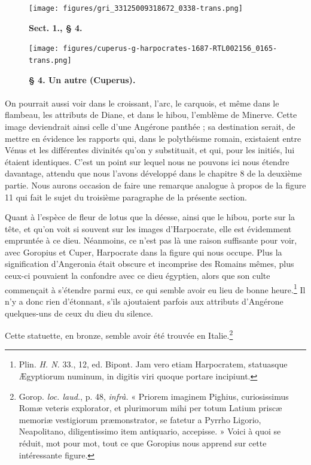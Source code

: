 \documentclass[a4paper, 11pt, oneside, polutonikogreek, french]{article}
\begin{document}
\clearpage
\vspace*{\fill}
\begin{figure}[H]
\centering
\texttt{[image: figures/gri\_33125009318672\_0338-trans.png]}
\caption{\bfseries Sect. 1., § 4.}
\end{figure}
\vspace*{\fill}
\clearpage
\vspace*{\fill}
\begin{figure}[H]
\centering
\texttt{[image: figures/cuperus-g-harpocrates-1687-RTL002156\_0165-trans.png]}
\caption{\bfseries § 4. Un autre (Cuperus).}
\end{figure}
\vspace*{\fill}
\clearpage
\paragraph{}
On pourrait aussi voir dans le croissant, l'arc, le carquois, et même dans le flambeau, les attributs de Diane, et dans le hibou, l'emblème de Minerve. Cette image deviendrait ainsi celle d'une Angérone panthée ; sa destination serait, de mettre en évidence les rapports qui, dans le polythéisme romain, existaient entre Vénus et les différentes divinités qu'on y substituait, et qui, pour les initiés, lui étaient identiques. C'est un point sur lequel nous ne pouvons ici nous étendre davantage, attendu que nous l'avons développé dans le chapitre 8 de la deuxième partie. Nous aurons occasion de faire une remarque analogue à propos de la figure 11 qui fait le sujet du troisième paragraphe de la présente section.

Quant à l'espèce de fleur de lotus que la déesse, ainsi que le hibou, porte sur la tête, et qu'on voit si souvent sur les images d'Harpocrate, elle est évidemment empruntée à ce dieu. Néanmoins, ce n'est pas là une raison suffisante pour voir, avec Goropius et Cuper, Harpocrate dans la figure qui nous occupe. Plus la signification d'Angeronia était obscure et incomprise des Romains mêmes, plus ceux-ci pouvaient la confondre avec ce dieu égyptien, alors que son culte commençait à s'étendre parmi eux, ce qui semble avoir eu lieu de bonne heure.\footnote{Plin. \emph{H. N.} 33., 12, ed. Bipont. Jam vero etiam Harpocratem, statuasque Ægyptiorum numinum, in digitis viri quoque portare incipiunt.} Il n'y a donc rien d'étonnant, s'ils ajoutaient parfois aux attributs d'Angérone quelques-uns de ceux du dieu du silence.

Cette statuette, en bronze, semble avoir été trouvée en Italie.\footnote{Gorop. \emph{loc. laud.}, p. 48, \emph{infrà.} « Priorem imaginem Pighius, curiosissimus Romæ veteris explorator, et plurimorum mihi per totum Latium priscæ memoriæ vestigiorum præmonstrator, se fatetur a Pyrrho Ligorio, Neapolitano, diligentissimo item antiquario, accepisse. » Voici à quoi se réduit, mot pour mot, tout ce que Goropius nous apprend sur cette intéressante figure.}
\end{document}
